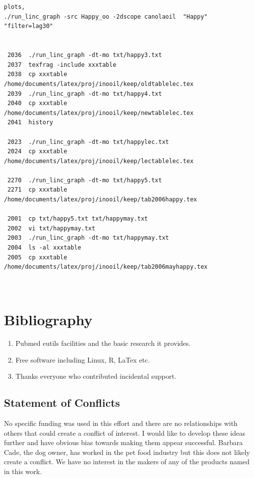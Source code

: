 \begin{lstlisting}


plots, 
./run_linc_graph -src Happy_oo -2dscope canolaoil  "Happy" "filter=lag30"


 2036  ./run_linc_graph -dt-mo txt/happy3.txt 
 2037  texfrag -include xxxtable 
 2038  cp xxxtable /home/documents/latex/proj/inooil/keep/oldtablelec.tex
 2039  ./run_linc_graph -dt-mo txt/happy4.txt 
 2040  cp xxxtable /home/documents/latex/proj/inooil/keep/newtablelec.tex
 2041  history

 2023  ./run_linc_graph -dt-mo txt/happylec.txt 
 2024  cp xxxtable /home/documents/latex/proj/inooil/keep/lectablelec.tex

 2270  ./run_linc_graph -dt-mo txt/happy5.txt 
 2271  cp xxxtable /home/documents/latex/proj/inooil/keep/tab2006happy.tex

 2001  cp txt/happy5.txt txt/happymay.txt
 2002  vi txt/happymay.txt
 2003  ./run_linc_graph -dt-mo txt/happymay.txt 
 2004  ls -al xxxtable
 2005  cp xxxtable /home/documents/latex/proj/inooil/keep/tab2006mayhappy.tex 



\end{lstlisting}
\section{Bibliography}






\begin{acknowledgments} 

% 
\begin{enumerate}
\item Pubmed eutils facilities and the basic research it provides. 
\item Free software including Linux, R, LaTex  etc.
\item Thanks everyone who contributed incidental support. 
\end{enumerate}

\end{acknowledgments}

\clearpage
\appendix

\begin{mdpicomment}

\section{ Statement of Conflicts }
 No specific funding was used in this effort and there are no relationships
with others that could create a conflict of interest. I would like to develop
these ideas further and have obvious bias towards making them appear 
successful. Barbara Cade, the dog owner, has worked in the pet food industry
but this does not likely create a conflict. We have no interest in the
makers of any of the products named in this work.  

\end{mdpicomment}

